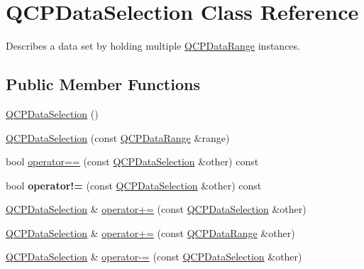 \hypertarget{class_q_c_p_data_selection}{}\section{Q\+C\+P\+Data\+Selection Class Reference}
\label{class_q_c_p_data_selection}


Describes a data set by holding multiple \mbox{\hyperlink{class_q_c_p_data_range}{Q\+C\+P\+Data\+Range}} instances.  


\subsection*{Public Member Functions}
\begin{DoxyCompactItemize}
\item 
\mbox{\hyperlink{class_q_c_p_data_selection_a0e0b7faaec7df1a7c77dd6f4883cdf0d}{Q\+C\+P\+Data\+Selection}} ()
\item 
\mbox{\hyperlink{class_q_c_p_data_selection_a738dfb4f5718c5df5ed35ea33ac37818}{Q\+C\+P\+Data\+Selection}} (const \mbox{\hyperlink{class_q_c_p_data_range}{Q\+C\+P\+Data\+Range}} \&range)
\item 
bool \mbox{\hyperlink{class_q_c_p_data_selection_a664fa566569b17148abafd6b1dbbf347}{operator==}} (const \mbox{\hyperlink{class_q_c_p_data_selection}{Q\+C\+P\+Data\+Selection}} \&other) const
\item 
\mbox{\label{class_q_c_p_data_selection_a8324733cc88660ee4792ee60d6a4520c}} 
bool {\bfseries operator!=} (const \mbox{\hyperlink{class_q_c_p_data_selection}{Q\+C\+P\+Data\+Selection}} \&other) const
\item 
\mbox{\hyperlink{class_q_c_p_data_selection}{Q\+C\+P\+Data\+Selection}} \& \mbox{\hyperlink{class_q_c_p_data_selection_a4584d4b0ea5c4f095bd7b70f88eb5d9d}{operator+=}} (const \mbox{\hyperlink{class_q_c_p_data_selection}{Q\+C\+P\+Data\+Selection}} \&other)
\item 
\mbox{\hyperlink{class_q_c_p_data_selection}{Q\+C\+P\+Data\+Selection}} \& \mbox{\hyperlink{class_q_c_p_data_selection_a17058640d4e6f49984a0e7e42043df1b}{operator+=}} (const \mbox{\hyperlink{class_q_c_p_data_range}{Q\+C\+P\+Data\+Range}} \&other)
\item 
\mbox{\hyperlink{class_q_c_p_data_selection}{Q\+C\+P\+Data\+Selection}} \& \mbox{\hyperlink{class_q_c_p_data_selection_a66f9fab70b026baa64bf8e52fe5de07e}{operator-\/=}} (const \mbox{\hyperlink{class_q_c_p_data_selection}{Q\+C\+P\+Data\+Selection}} \&other)

\end{DoxyCompactItemize}
